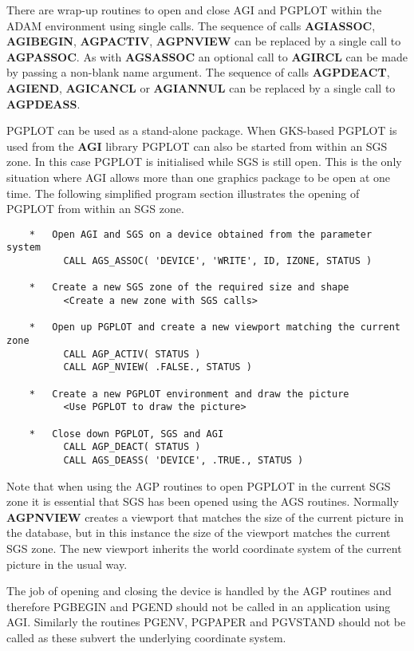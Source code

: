 \documentclass[twoside,11pt]{article}
\newcommand{\htmlref}[2]{#1}
\renewcommand{\_}{\texttt{\symbol{95}}}
\begin{document}
There are wrap-up routines to open and close AGI and PGPLOT within the
ADAM environment using single calls. The sequence of calls {\bf AGI\_ASSOC},
{\bf AGI\_BEGIN},  {\bf AGP\_ACTIV}, {\bf AGP\_NVIEW} can be replaced by a
single call to 
\htmlref{{\bf AGP\_ASSOC}}{AGP_ASSOC}. As with {\bf AGS\_ASSOC} an optional call
to \htmlref{{\bf AGI\_RCL}}{AGI_RCL} can be made by passing a non-blank 
name argument.
The sequence of calls {\bf AGP\_DEACT}, {\bf AGI\_END}, {\bf AGI\_CANCL}
or {\bf AGI\_ANNUL} can be replaced by a single call to 
\htmlref{{\bf AGP\_DEASS}}{AGP_DEASS}.

PGPLOT can be used as a stand-alone package. When GKS-based PGPLOT is
used from the {\bf AGI} library PGPLOT can also be started from
within an SGS zone. In this case PGPLOT
is initialised while SGS is still open. This is the only situation where
AGI allows more than one graphics package to be open at one time.
The following simplified program section illustrates the opening of
PGPLOT from within an SGS zone.
\begin{verbatim}
    *   Open AGI and SGS on a device obtained from the parameter system
          CALL AGS_ASSOC( 'DEVICE', 'WRITE', ID, IZONE, STATUS )

    *   Create a new SGS zone of the required size and shape
          <Create a new zone with SGS calls>

    *   Open up PGPLOT and create a new viewport matching the current zone
          CALL AGP_ACTIV( STATUS )
          CALL AGP_NVIEW( .FALSE., STATUS )

    *   Create a new PGPLOT environment and draw the picture
          <Use PGPLOT to draw the picture>

    *   Close down PGPLOT, SGS and AGI
          CALL AGP_DEACT( STATUS )
          CALL AGS_DEASS( 'DEVICE', .TRUE., STATUS )
\end{verbatim}

Note that when using the AGP routines to open PGPLOT in the current SGS
zone it is essential that SGS has been opened using the AGS routines.
Normally {\bf AGP\_NVIEW} creates a viewport that matches the size of
the current picture in the database, but in this instance the size of
the viewport matches the current SGS zone.
The new viewport inherits the world coordinate system of the current picture
in the usual way.

The job of opening and closing the device is handled by the AGP\_ routines
and therefore PGBEGIN and PGEND should not be called in an application
using AGI. Similarly the routines PGENV, PGPAPER and PGVSTAND should not be
called as these subvert the underlying coordinate system.
\end{document}
